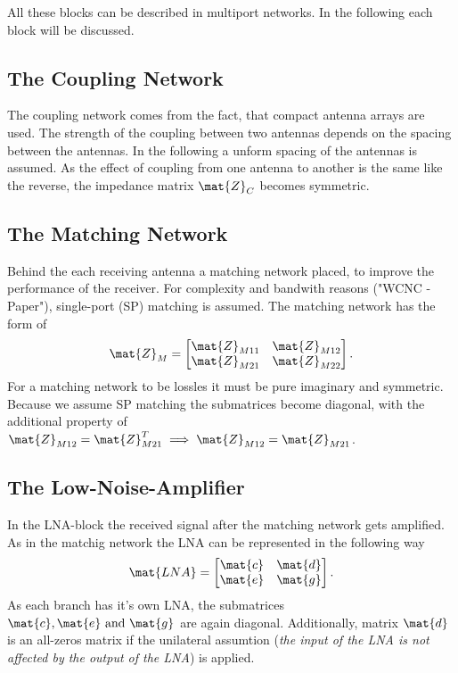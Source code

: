 All these blocks can be described in multiport networks.
In the following each block will be discussed.

\subsection{The Coupling Network}
\label{sec:coupling_network}
The coupling network comes from the fact, that compact antenna arrays are used.
The strength of the coupling between two antennas depends on the spacing between the antennas.
In the following a unform spacing of the antennas is assumed.
As the effect of coupling from one antenna to another is the same like the reverse, the impedance matrix $\mat{Z}_C$ becomes symmetric.


\subsection{The Matching Network}
Behind the each receiving antenna a matching network placed, to improve the performance of the receiver.
For complexity and bandwith reasons ("WCNC - Paper"), single-port (SP) matching is assumed.
The matching network has the form of 
\begin{equation}
\mat{Z}_M=
\begin{bmatrix}
\mat{Z}_{M11} & \mat{Z}_{M12} \\
\mat{Z}_{M21} & \mat{Z}_{M22}
\end{bmatrix}.
\end{equation}
For a matching network to be lossles it must be pure imaginary and symmetric\cite{Nossek}.
Because we assume SP matching the submatrices become diagonal, with the additional property of $\mat{Z}_{M12} = \mat{Z}_{M21}^T \implies \mat{Z}_{M12} = \mat{Z}_{M21}$.


\subsection{The Low-Noise-Amplifier}
In the LNA-block the received signal after the matching network gets amplified.
As in the matchig network the LNA can be represented in the following way
\begin{equation}
\mat{LNA}=
\begin{bmatrix}
\mat{c} & \mat{d} \\
\mat{e} & \mat{g}
\end{bmatrix}.
\end{equation}
As each branch has it's own LNA, the submatrices $\mat{c},\mat{e}\text{ and }\mat{g}$ are again diagonal.
Additionally, matrix $\mat{d}$ is an all-zeros matrix if the unilateral assumtion (\textit{the input of the LNA is not affected by the output of the LNA}) is applied.

